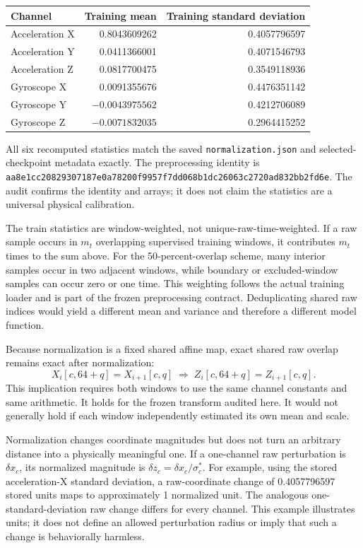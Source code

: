 \documentclass[11pt,a4paper]{article}
\newcommand{\code}[1]{{\small\ttfamily\nolinkurl{#1}}}
\begin{document}
\begin{center}\begin{tabular}{@{}lrr@{}}\toprule Channel & Training mean & Training standard deviation\\\midrule
Acceleration X & 0.8043609262 & 0.4057796597\\
Acceleration Y & 0.0411366001 & 0.4071546793\\
Acceleration Z & 0.0817700475 & 0.3549118936\\
Gyroscope X & 0.0091355676 & 0.4476351142\\
Gyroscope Y & $-0.0043975562$ & 0.4212706089\\
Gyroscope Z & $-0.0071832035$ & 0.2964415252\\\bottomrule
\end{tabular}\end{center}
All six recomputed statistics match the saved \code{normalization.json} and selected-checkpoint metadata exactly. The preprocessing identity is \code{aa8e1cc20829307187e0a78200f9957f7dd068b1dc26063c2720ad832bb2fd6e}. The audit confirms the identity and arrays; it does not claim the statistics are a universal physical calibration.

The train statistics are window-weighted, not unique-raw-time-weighted. If a raw sample occurs in $m_t$ overlapping supervised training windows, it contributes $m_t$ times to the sum above. For the 50-percent-overlap scheme, many interior samples occur in two adjacent windows, while boundary or excluded-window samples can occur zero or one time. This weighting follows the actual training loader and is part of the frozen preprocessing contract. Deduplicating shared raw indices would yield a different mean and variance and therefore a different model function.

Because normalization is a fixed shared affine map, exact shared raw overlap remains exact after normalization:
\[
 X_i[c,64+q]=X_{i+1}[c,q]\;\Longrightarrow\;
 Z_i[c,64+q]=Z_{i+1}[c,q].
\]
This implication requires both windows to use the same channel constants and same arithmetic. It holds for the frozen transform audited here. It would not generally hold if each window independently estimated its own mean and scale.

Normalization changes coordinate magnitudes but does not turn an arbitrary distance into a physically meaningful one. If a one-channel raw perturbation is $\delta x_c$, its normalized magnitude is $\delta z_c=\delta x_c/\sigma_c^*$. For example, using the stored acceleration-X standard deviation, a raw-coordinate change of 0.4057796597 stored units maps to approximately 1 normalized unit. The analogous one-standard-deviation raw change differs for every channel. This example illustrates units; it does not define an allowed perturbation radius or imply that such a change is behaviorally harmless.
\end{document}

